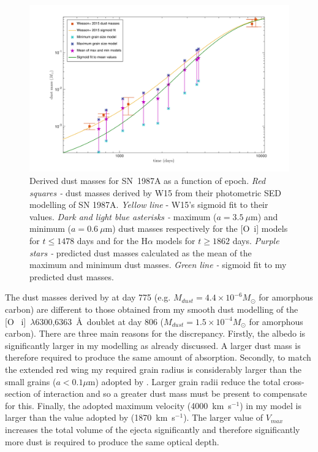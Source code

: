 \begin{landscape}
\begin{figure}
\begin{center}
\includegraphics[trim =70 30 85 15,clip=true,scale=0.52]{chapters/chapter5/images/Mdust_evol7.pdf}
\caption{Derived dust masses for SN~1987A as a function of epoch. 
\textit{Red squares -} dust masses derived by W15 
from their photometric SED modelling of SN 1987A. \textit{Yellow line} - 
W15's sigmoid fit to 
their values. \textit{Dark and light blue asterisks -} maximum 
($a=3.5~\mu$m) and 
minimum ($a=0.6~\mu$m) dust masses respectively for the [O~{\sc i}] models 
for $t \le 1478$ days and for the H$\alpha$ models for $t \ge 1862$ days. 
\textit{Purple 
stars -} predicted dust masses calculated as the mean of the maximum and 
minimum dust masses.
\textit{Green line -} sigmoid fit 
to my predicted dust masses.}
\label{Mdust}
\end{center}
\end{figure}
\end{landscape}

The dust masses derived by \citet{Lucy1989} at day 775 (e.g. $M_{dust}=4.4 
\times 10^{-6} M_{\odot}$ for amorphous carbon) are  
different to those obtained from my smooth dust modelling of the [O~{\sc 
i}]~$\lambda$6300,6363~\AA\ doublet at day 806 ($M_{dust}=1.5 \times 
10^{-4} M_{\odot}$ for amorphous carbon).  There are three main reasons 
for the discrepancy.  Firstly, the albedo is significantly larger in my 
modelling as already discussed.  A larger dust mass is therefore required 
to produce the same amount of absorption.  Secondly, to match the extended 
red wing my required grain radius is considerably larger than the small 
grains ($a < 0.1\mu$m) adopted by \citet{Lucy1989}. Larger grain radii 
reduce the total cross-section of interaction and so a greater dust mass 
must be present to compensate for this. Finally, the adopted maximum 
velocity (4000~km~s$^{-1}$) in my model is larger than the value adopted 
by \citet{Lucy1989} (1870~km~s$^{-1}$).  The larger value of $V_{max}$ 
increases the total volume of the ejecta significantly and therefore 
significantly more dust is required to produce the same optical depth.

